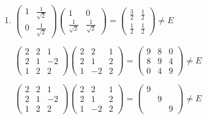 	 \paragraph{} %
		 \begin{enumerate}
			 \item %
			       \(
			       \begin{pmatrix}
				       1 & \frac{1}{\sqrt{2}} \\
				       0 & \frac{1}{\sqrt{2}}\end{pmatrix}
			       \begin{pmatrix}
				       1                  & 0                  \\
				       \frac{1}{\sqrt{2}} & \frac{1}{\sqrt{2}}\end{pmatrix} =
			       \begin{pmatrix}
				       \frac{3}{2} & \frac{1}{2} \\
				       \frac{1}{2} & \frac{1}{2}\end{pmatrix} \neq E \)

			       \( \begin{pmatrix}
				       2 & 2 & 1  \\
				       2 & 1 & -2 \\
				       1 & 2 & 2
			       \end{pmatrix}
			       \begin{pmatrix}
				       2 & 2  & 1 \\
				       2 & 1  & 2 \\
				       1 & -2 & 2
			       \end{pmatrix}
			       = \begin{pmatrix}
				       9 & 8 & 0 \\
				       8 & 9 & 4 \\
				       0 & 4 & 9
			       \end{pmatrix} \neq E \)

			       \( \begin{pmatrix}
				       2 & 2 & 1  \\
				       2 & 1 & -2 \\
				       1 & 2 & 2
			       \end{pmatrix}
			       \begin{pmatrix}
				       2 & 2  & 1 \\
				       2 & 1  & 2 \\
				       1 & -2 & 2
			       \end{pmatrix} =
			       \begin{pmatrix}
				       9 &   &   \\
				         & 9 &   \\
				         &   & 9
			       \end{pmatrix} \neq E \)


\end{enumerate}
